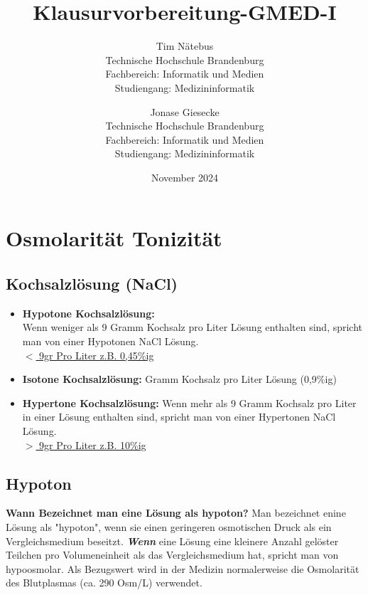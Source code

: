 \documentclass{article}
\title{Klausurvorbereitung-GMED-I}
\author{
    Tim Nätebus \\
    Technische Hochschule Brandenburg \\
    Fachbereich: Informatik und Medien \\
    Studiengang: Medizininformatik \\
    \and
    Jonase Giesecke \\
    Technische Hochschule Brandenburg \\
    Fachbereich: Informatik und Medien \\
    Studiengang: Medizininformatik    
}
\date{November 2024}
\begin{document}
\maketitle

\newpage
%
\newpage
\section{Osmolarität \/ Tonizität}
\subsection{Kochsalzlösung (NaCl)}
\begin{itemize}
    \item \textbf{Hypotone Kochsalzlösung:} \\
    Wenn weniger als 9 Gramm Kochsalz pro Liter Lösung enthalten sind, spricht man von einer Hypotonen NaCl Lösung.
    \\ \underline{$<$ 9gr Pro Liter z.B. 0,45\%ig}
    \item \textbf{Isotone Kochsalzlösung:}  Gramm Kochsalz pro Liter Lösung (0,9\%ig)
    \item \textbf{Hypertone Kochsalzlösung:} \newline Wenn mehr als 9 Gramm Kochsalz pro Liter in einer Lösung enthalten sind, spricht man von einer Hypertonen NaCl Lösung.
    \\
    \underline{$>$ 9gr Pro Liter z.B. 10\%ig}
\end{itemize}

\subsection{Hypoton}
\textbf{Wann Bezeichnet man eine Lösung als hypoton?}
Man bezeichnet enine Lösung als "hypoton", wenn sie einen geringeren osmotischen Druck als ein Vergleichsmedium beseitzt. \newline 
\textbf{\textit{Wenn}} eine Lösung eine kleinere Anzahl gelöster Teilchen pro Volumeneinheit als das Vergleichsmedium hat, spricht man von hypoosmolar. \newline
Als Bezugswert wird in der Medizin normalerweise die Osmolarität des Blutplasmas (ca. 290 Osm/L) verwendet.
\end{document}
